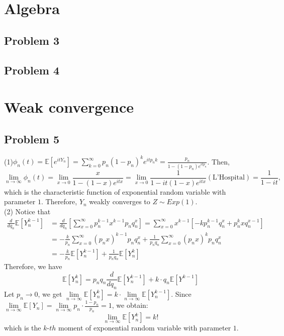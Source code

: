 \documentclass[12pt]{article}
\begin{document}
\section{Algebra}

	\subsection*{Problem 3}
	
	\subsection*{Problem 4}


\section{Weak convergence}

\subsection*{Problem 5}
(1)$\phi_{n}(t)=\mathbb{E}[e^{itY_{n}}]=\sum\limits_{k=0}^{\infty}p_{n}(1-p_{n})^{k}e^{itp_{n}k}=\frac{p_{n}}{1-(1-p_{n})e^{itp_{n}}}$. Then, $$\lim\limits_{n\rightarrow\infty}\phi_{n}(t)=\lim\limits_{x\rightarrow 0}\frac{x}{1-(1-x)e^{itx}}=\lim\limits_{x\rightarrow 0}\frac{1}{1-it(1-x)e^{itx}}(\text{L'Hospital})=\frac{1}{1-it},$$
which is the characteristic function of exponential random variable with parameter $1$. Therefore, $Y_{n}$ weakly converges to $Z\sim Exp(1)$.\\
(2) Notice that 
\begin{align*}
\frac{d}{d q_{n}}\mathbb{E}[Y_{n}^{k-1}]&=\frac{d}{d q_{n}}[\sum_{x=0}^{\infty}p_{n}^{k-1}x^{k-1}p_{n}q_{n}^{x}]=	\sum_{x=0}^{\infty}x^{k-1}[-kp_{n}^{k-1}q_{n}^{x}+p_{n}^{k}x q_{n}^{x-1}]\\
&=-\frac{k}{p_{n}}\sum_{x=0}^{\infty}(p_{n}x)^{k-1}p_{n}q_{n}^{x}+\frac{1}{p_{n}q_{n}}\sum_{x=0}^{\infty}(p_{n}x)^{k}p_{n}q_{n}^{x}\\
&=-\frac{k}{p_{n}}\mathbb{E}[Y_{n}^{k-1}]+\frac{1}{p_{n}q_{n}}\mathbb{E}[Y_{n}^{k}]
\end{align*}
Therefore, we have $$\mathbb{E}[Y_{n}^{k}]=p_{n}q_{n}\frac{d}{d q_{n}}\mathbb{E}[Y_{n}^{k-1}]+k\cdot q_{n}\mathbb{E}[Y^{k-1}]$$
Let $p_{n}\rightarrow 0$, we get $\lim\limits_{n\rightarrow\infty}\mathbb{E}[Y_{n}^{k}]=k\cdot \lim\limits_{n\rightarrow\infty}\mathbb{E}[Y_{n}^{k-1}]$.
Since $\lim\limits_{n\rightarrow\infty}\mathbb{E}[Y_{n}]=\lim\limits_{n\rightarrow\infty}p_{n}\cdot\frac{1-p_{n}}{p_{n}}=1$, we obtain: $$\lim\limits_{n\rightarrow\infty}\mathbb{E}[Y_{n}^k]=k!$$
which is the $k$-$th$ moment of exponential random variable with parameter $1$.
\end{document}
